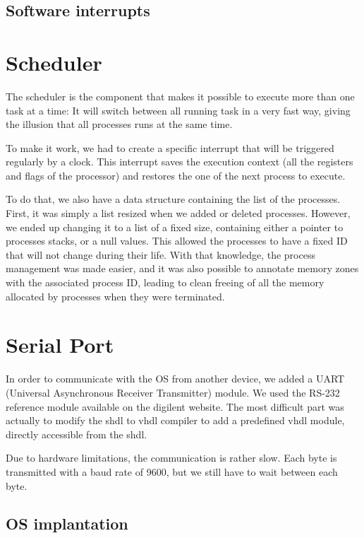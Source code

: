 \documentclass[openany, a4paper]{book}
\begin{document}
      \subsection{Software interrupts}

    \section{Scheduler}
      The scheduler is the component that makes it possible to execute more than
      one task at a time: It will switch between all running task in a very fast
      way, giving the illusion that all processes runs at the same time.

      To make it work, we had to create a specific interrupt that will be
      triggered regularly by a clock. This interrupt saves the execution
      context (all the registers and flags of the processor) and restores the
      one of the next process to execute.

      To do that, we also have a data structure containing the list of the
      processes. First, it was simply a list resized when we added or deleted
      processes. However, we ended up changing it to a list of a fixed size,
      containing either a pointer to processes stacks, or a null values.
      This allowed the processes to have a fixed ID that will not change during
      their life. With that knowledge, the process management was made
      easier, and it was also possible to annotate memory zones with the
      associated process ID, leading to clean freeing of all the memory
      allocated by processes when they were terminated.

    \section{Serial Port}
      In order to communicate with the OS from another device, we added a UART 
      (Universal Asynchronous Receiver Transmitter) module. We used the RS-232
      reference module available on the digilent website. The most difficult
      part was actually to modify the shdl to vhdl compiler to add a predefined
      vhdl module, directly accessible from the shdl.

      Due to hardware limitations, the communication is rather slow. Each byte
      is transmitted with a baud rate of 9600, but we still have to wait
      between each byte.

      \subsection{OS implantation}
\end{document}
